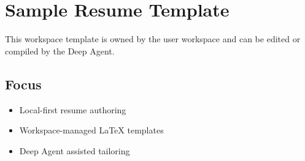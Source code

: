 \documentclass{article}
\begin{document}
\section*{Sample Resume Template}

This workspace template is owned by the user workspace and can be edited or compiled by the Deep Agent.

\subsection*{Focus}

\begin{itemize}
  \item Local-first resume authoring
  \item Workspace-managed LaTeX templates
  \item Deep Agent assisted tailoring
\end{itemize}
\end{document}
